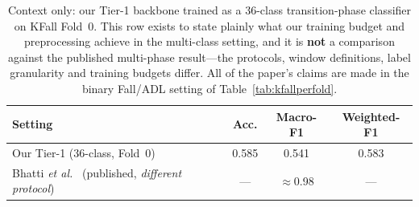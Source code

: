 \begin{table}[!t]
\centering
\caption{Context only: our Tier-1 backbone trained as a $36$-class transition-phase classifier on KFall Fold~0. This row exists to state plainly what our training budget and preprocessing achieve in the multi-class setting, and it is \textbf{not} a comparison against the published multi-phase result---the protocols, window definitions, label granularity and training budgets differ. All of the paper's claims are made in the binary Fall/ADL setting of Table~\ref{tab:kfallperfold}.}
\label{tab:kfallmc}
\begin{tabular}{lccc}
\toprule
Setting & Acc. & Macro-F1 & Weighted-F1 \\
\midrule
Our Tier-1 ($36$-class, Fold~0) & 0.585 & 0.541 & 0.583 \\
Bhatti \textit{et al.}~\cite{bhatti2025beyond} (published, \emph{different protocol}) & --- & $\approx$0.98 & --- \\
\bottomrule
\end{tabular}
\end{table}
